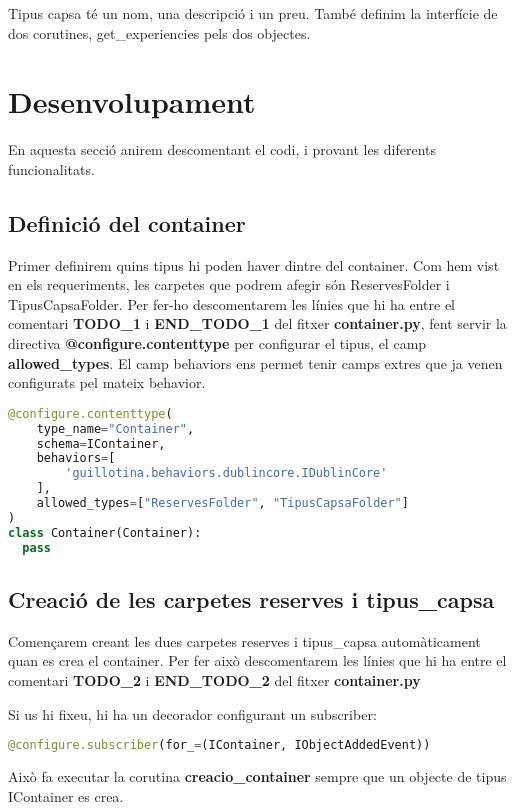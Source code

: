 \documentclass[a4paper, 11pt]{article}
\begin{document}
  Tipus capsa té un nom, una descripció i un preu. També definim la
  interfície de dos corutines, get\_experiencies pels dos objectes.


\pagebreak

\section{Desenvolupament}
En aquesta secció anirem descomentant el codi, i provant les diferents
funcionalitats.
\subsection{Definició del container}
Primer definirem quins tipus hi poden haver dintre del container. Com
hem vist en els requeriments, les carpetes que podrem afegir són
ReservesFolder i TipusCapsaFolder. Per fer-ho descomentarem les línies
que hi ha entre el comentari \textbf{TODO\_1} i \textbf{END\_TODO\_1}
del fitxer \textbf{container.py}, fent servir la directiva
\textbf{{@}configure.contenttype} per configurar el tipus, el camp
\textbf{allowed\_types}. El camp behaviors ens permet tenir camps
extres que ja venen configurats pel mateix behavior.

\begin{lstlisting}[language=Python, caption=Definició container]
@configure.contenttype(
    type_name="Container",
    schema=IContainer,
    behaviors=[
        'guillotina.behaviors.dublincore.IDublinCore'
    ],
    allowed_types=["ReservesFolder", "TipusCapsaFolder"]
)
class Container(Container):
  pass
\end{lstlisting}


\subsection{Creació de les carpetes reserves i tipus\_capsa}
Començarem creant les dues carpetes reserves i tipus\_capsa
automàticament quan es crea el container. Per fer això descomentarem
les línies que hi ha entre el comentari \textbf{TODO\_2} i
\textbf{END\_TODO\_2} del fitxer \textbf{container.py}

Si us hi fixeu, hi ha un decorador configurant un subscriber:
\begin{lstlisting}[language=Python, caption=Subscriber container]
  @configure.subscriber(for_=(IContainer, IObjectAddedEvent))
\end{lstlisting}
Això fa executar la corutina \textbf{creacio\_container} sempre que un objecte
de tipus IContainer es crea.
  
\end{document}

